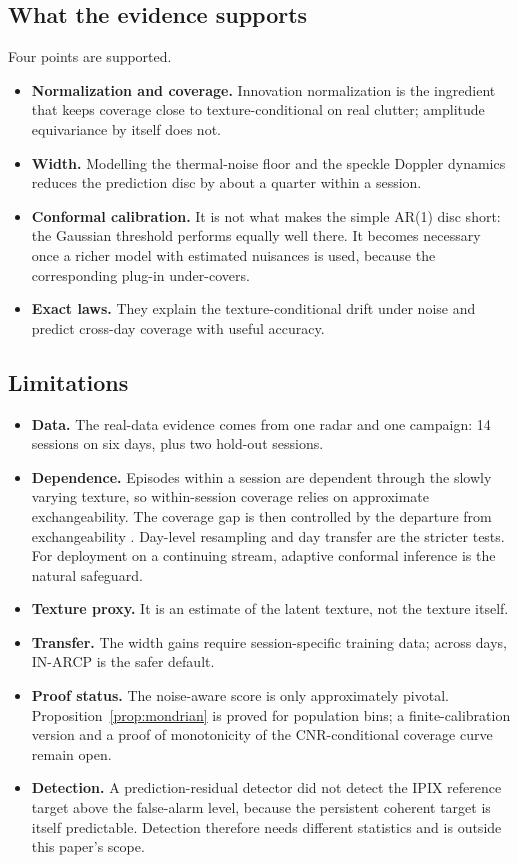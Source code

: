 \subsection{What the evidence supports}
Four points are supported.
\begin{itemize}[leftmargin=*,itemsep=1pt]
\item \textbf{Normalization and coverage.} Innovation normalization is the ingredient that keeps coverage close to texture-conditional on real clutter; amplitude equivariance by itself does not.
\item \textbf{Width.} Modelling the thermal-noise floor and the speckle Doppler dynamics reduces the prediction disc by about a quarter within a session.
\item \textbf{Conformal calibration.} It is not what makes the simple AR(1) disc short: the Gaussian threshold performs equally well there. It becomes necessary once a richer model with estimated nuisances is used, because the corresponding plug-in under-covers.
\item \textbf{Exact laws.} They explain the texture-conditional drift under noise and predict cross-day coverage with useful accuracy.
\end{itemize}

\subsection{Limitations}
\begin{itemize}[leftmargin=*,itemsep=1pt]
\item \textbf{Data.} The real-data evidence comes from one radar and one campaign: 14 sessions on six days, plus two hold-out sessions.
\item \textbf{Dependence.} Episodes within a session are dependent through the slowly varying texture, so within-session coverage relies on approximate exchangeability. The coverage gap is then controlled by the departure from exchangeability \cite{barber2023}. Day-level resampling and day transfer are the stricter tests. For deployment on a continuing stream, adaptive conformal inference \cite{gibbs2021aci} is the natural safeguard.
\item \textbf{Texture proxy.} It is an estimate of the latent texture, not the texture itself.
\item \textbf{Transfer.} The width gains require session-specific training data; across days, IN-ARCP is the safer default.
\item \textbf{Proof status.} The noise-aware score is only approximately pivotal. Proposition~\ref{prop:mondrian} is proved for population bins; a finite-calibration version and a proof of monotonicity of the CNR-conditional coverage curve remain open.
\item \textbf{Detection.} A prediction-residual detector did not detect the IPIX reference target above the false-alarm level, because the persistent coherent target is itself predictable. Detection therefore needs different statistics and is outside this paper's scope.
\end{itemize}
